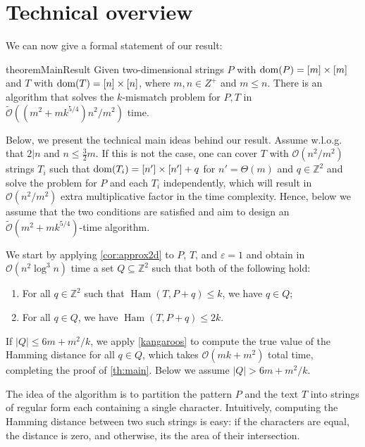 \documentclass[11pt, letterpaper]{article}
\theoremstyle{plain}
\theoremstyle{definition}
\theoremstyle{remark}
\newcommand{\Z}{\mathbb{Z}}
\renewcommand{\O}{\mathcal{O}}
\newcommand{\tO}{\tilde{\mathcal{O}}}
\DeclareMathOperator*{\Ham}{Ham}
\newcommand{\absolute}[1]{\left\lvert#1\right\rvert}
\begin{document}

\section{Technical overview}
We can now give a formal statement of our result:

\begin{restatable}{theorem}{MainResult}\label{th:main}
Given two-dimensional strings $P$ with $\operatorname*{dom}(P) = [m] \times [m]$ and $T$ with $\operatorname*{dom}(T) = [n] \times [n]$, where $m,n\in Z^+$ and $m \le n$. There is an algorithm that solves the $k$-mismatch problem for $P,T$ in $\tO((m^2 + mk^{5/4})n^2 / m^2)$ time.
\end{restatable}

Below, we present the technical main ideas behind our result. Assume w.l.o.g. that $2|n$ and $n \le \frac{3}{2}m$. If this is not the case, one can cover $T$ with $\O(n^2/m^2)$ strings $T_i$ such that $\operatorname*{dom}(T_i) = [n'] \times [n'] + q$ for $n' = \Theta(m)$ and $q \in \Z^2$ and solve the problem for $P$ and each $T_i$ independently, which will result in $\O(n^2/m^2)$ extra multiplicative factor in the time complexity. Hence, below we assume that the two conditions are satisfied and aim to design an $\tO(m^2 + mk^{5/4})$-time algorithm. 

We start by applying \cref{cor:approx2d} to $P$, $T$, and $\varepsilon = 1$ and obtain in $\O(n^2 \log^3 n)$ time a set $Q \subseteq \Z^2$ such that both of the following hold:
\begin{enumerate}
\item For all $q \in \Z^2$ such that $\Ham(T, P+q) \le k$, we have $q \in Q$;
\item For all $q \in Q$, we have $\Ham(T, P+q) \le 2 k$.
\end{enumerate}

If $\absolute{Q} \le 6m + m^2/k$, we apply \cref{kangaroos} to compute the true value of the Hamming distance for all $q \in Q$, which takes $\O(mk+m^2)$ total time, completing the proof of \cref{th:main}. Below we assume $\absolute{Q} > 6m + m^2/k$. 

The idea of the algorithm is to partition the pattern $P$ and the text $T$ into strings of regular form each containing a single character. Intuitively, computing the Hamming distance between two such strings is easy: if the characters are equal, the distance is zero, and otherwise, its the area of their intersection.
\end{document}
